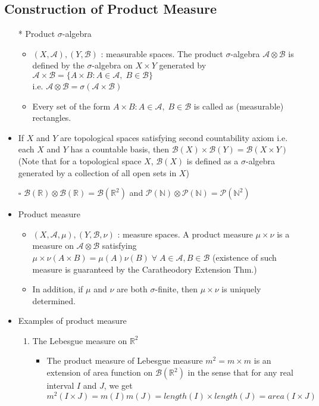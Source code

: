 \documentclass[12pt]{article}
\newcommand{\sq}{$\square$}
\newcommand{\N}{\mathbb{N}}
\newcommand{\R}{\mathbb{R}}
\newcommand{\A}{\mathcal{A}}
\newcommand{\B}{\mathcal{B}}
\newcommand{\Borel}{\mathcal{B}(\mathbb{R})}
\newcommand{\forany}{\; \forall \;}
\begin{document}
\subsection{Construction of Product Measure}
\smallskip
\begin{itemize}
    \item [*] Product $\sigma$-algebra
    \begin{itemize}
        \item $(X,\A),(Y,\B)$ : measurable spaces. The product $\sigma$-algebra $\A\otimes \B$ is defined by the $\sigma$-algebra on $X\times Y$ generated by $\A\times \B=\{A\times B: A\in \A, \;B\in \B\}$ \\i.e.\; $\A\otimes \B=\sigma(\A\times\B)$ 
        \item Every set of the form $A\times B: A\in \A, \;B\in \B$ is called as (measurable) rectangles. 
    \end{itemize}
    \item If $X$ and $Y$ are topological spaces satisfying second countability axiom \; i.e.\, each $X$ and $Y$ has a countable basis, then $\B(X)\times\B(Y)=\B(X\times Y)$ \quad (Note that for a topological space $X$, $\B(X)$ is defined as a $\sigma$-algebra generated by a collection of all open sets in $X$)
    \item [\sq] $\Borel\otimes \Borel = \B(\R^2)$ and $\mathcal{P}(\N)\otimes\mathcal{P}(\N)=\mathcal{P}(\N^2)$
    \item Product measure
    \begin{itemize}
        \item $(X,\A, \mu),(Y,\B,\nu)$ : measure spaces. A product measure $\mu\times \nu$ is a measure on $\A\otimes \B$ satisfying $\mu\times\nu(A\times B)=\mu(A)\nu(B)\forany A\in \A, B\in \B$ (existence of such measure is guaranteed by the Caratheodory Extension Thm.)
        \item In addition, if $\mu$ and $\nu$ are both $\sigma$-finite, then $\mu\times \nu$ is uniquely determined.
    \end{itemize} 
\clearpage
    \item Examples of product measure
    \begin{enumerate}
        \item The Lebesgue measure on $\R^2$
        \begin{itemize}
            \item The product measure of Lebesgue measure $m^2=m\times m$ is an extension of area function on $\B(\R^2)$ in the sense that for any real interval $I$ and $J$, we get\\ $m^2(I\times J)=m(I)m(J)=length(I)\times length(J)=area(I\times J)$  

\end{itemize}
\end{enumerate}
\end{itemize}
\end{document}
